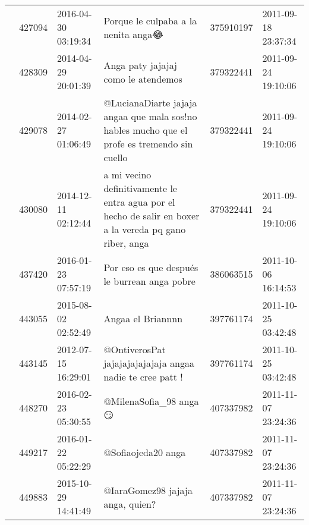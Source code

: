 \begin{tabular}{llllrl}
           & 427094  & 2016-04-30 03:19:34 &                                                                                                          Porque le culpaba a la nenita anga😂 &   375910197 & 2011-09-18 23:37:34 \\
           & 428309  & 2014-04-29 20:01:39 &                                                                                                          Anga paty jajajaj como le atendemos &   379322441 & 2011-09-24 19:10:06 \\
           & 429078  & 2014-02-27 01:06:49 &                                                 @LucianaDiarte jajaja angaa que mala sos!no hables mucho que el profe es tremendo sin cuello &   379322441 & 2011-09-24 19:10:06 \\
           & 430080  & 2014-12-11 02:12:44 &                                     a mi vecino definitivamente le entra agua por el hecho de salir en boxer a la vereda pq gano riber, anga &   379322441 & 2011-09-24 19:10:06 \\
           & 437420  & 2016-01-23 07:57:19 &                                                                                                 Por eso es que después le burrean anga pobre &   386063515 & 2011-10-06 16:14:53 \\
           & 443055  & 2015-08-02 02:52:49 &                                                                                                                            Angaa el Briannnn &   397761174 & 2011-10-25 03:42:48 \\
           & 443145  & 2012-07-15 16:29:01 &                                                                                    @OntiverosPat jajajajajajajaja angaa nadie te cree patt ! &   397761174 & 2011-10-25 03:42:48 \\
           & 448270  & 2016-02-23 05:30:55 &                                                                                                                       @MilenaSofia\_98 anga 😏 &   407337982 & 2011-11-07 23:24:36 \\
           & 449217  & 2016-01-22 05:22:29 &                                                                                                                           @Sofiaojeda20 anga &   407337982 & 2011-11-07 23:24:36 \\
           & 449883  & 2015-10-29 14:41:49 &                                                                                                             @IaraGomez98 jajaja anga, quien? &   407337982 & 2011-11-07 23:24:36 \\

\end{tabular}

